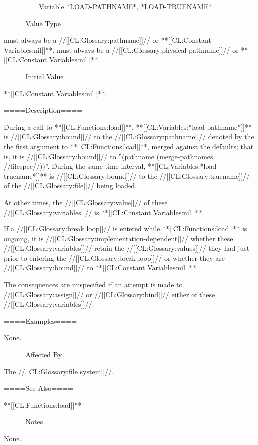 ====== Variable *LOAD-PATHNAME*, *LOAD-TRUENAME* ======

====Value Type====

 must always be a //[[CL:Glossary:pathname]]// or **[[CL:Constant Variables:nil]]**.  must always be a //[[CL:Glossary:physical pathname]]// or **[[CL:Constant Variables:nil]]**.

====Initial Value====

**[[CL:Constant Variables:nil]]**.

====Description====

During a call to **[[CL:Functions:load]]**, **[[CL:Variables:*load-pathname*]]** is //[[CL:Glossary:bound]]// to the //[[CL:Glossary:pathname]]// denoted by the the first argument to **[[CL:Functions:load]]**, merged against the defaults; that is, it is //[[CL:Glossary:bound]]// to ''(pathname (merge-pathnames //filespec//))''. During the same time interval, **[[CL:Variables:*load-truename*]]** is //[[CL:Glossary:bound]]// to the //[[CL:Glossary:truename]]// of the //[[CL:Glossary:file]]// being loaded.

At other times, the //[[CL:Glossary:value]]// of these //[[CL:Glossary:variables]]// is **[[CL:Constant Variables:nil]]**.

If a //[[CL:Glossary:break loop]]// is entered while **[[CL:Functions:load]]** is ongoing, it is //[[CL:Glossary:implementation-dependent]]// whether these //[[CL:Glossary:variables]]// retain the //[[CL:Glossary:values]]// they had just prior to entering the //[[CL:Glossary:break loop]]// or whether they are //[[CL:Glossary:bound]]// to **[[CL:Constant Variables:nil]]**.

The consequences are unspecified if an attempt is made to //[[CL:Glossary:assign]]// or //[[CL:Glossary:bind]]// either of these //[[CL:Glossary:variables]]//.

====Examples====

None.

====Affected By====

The //[[CL:Glossary:file system]]//.

====See Also====

**[[CL:Functions:load]]**

====Notes====

None.

